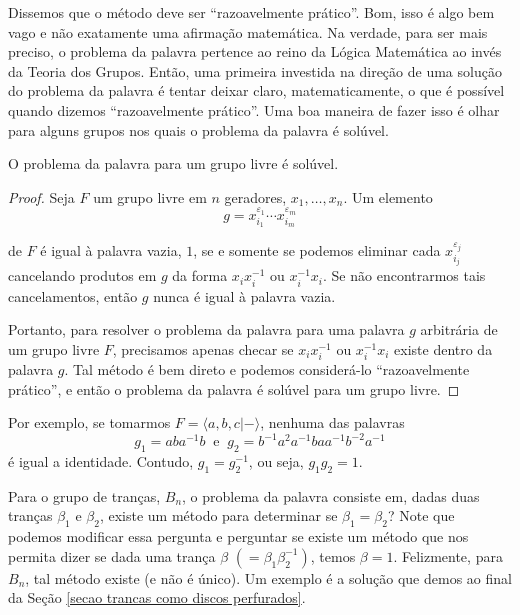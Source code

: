 	\par\vspace{0.3cm} Dissemos que o método deve ser ``razoavelmente prático''. Bom, isso é algo bem vago 
	e não exatamente uma afirmação matemática. Na verdade, para ser mais preciso, o problema da palavra 
	pertence ao reino da Lógica Matemática ao invés da Teoria dos Grupos. Então, uma primeira investida 
	na direção de uma solução do problema da palavra é tentar deixar claro, matematicamente, o que é possível
	quando dizemos ``razoavelmente prático''. Uma boa maneira de fazer isso é olhar para alguns grupos nos 
	quais o problema da palavra é solúvel.
	\begin{theorem}
	\label{problema da palavra soluvel para grupos livres}
		O problema da palavra para um grupo livre é solúvel.
	\end{theorem}
	\begin{proof}
		Seja $F$ um grupo livre em $n$ geradores, $x_1, \dots, x_n$. Um elemento
		\begin{equation*}
		    g = x_{i_1}^{\varepsilon_1}\cdots x_{i_m}^{\varepsilon_m}
		\end{equation*}
		\par\vspace{0.3cm} de $F$ é igual à palavra vazia, $1$, se e somente se podemos eliminar cada
		$x_{i_j}^{\varepsilon_j}$ cancelando produtos em $g$ da forma $x_ix_i^{-1}$ ou $x_i^{-1}x_i$. 
		Se não encontrarmos tais cancelamentos, então $g$ nunca é igual à palavra vazia.
		
		\par\vspace{0.3cm} Portanto, para resolver o problema da palavra para uma palavra $g$ arbitrária de 
		um grupo livre $F$, precisamos apenas checar se $x_ix_i^{-1}$ ou $x_i^{-1}x_i$ existe dentro da 
		palavra $g$. Tal método é bem direto e podemos considerá-lo ``razoavelmente prático'', e então o 
		problema da palavra é solúvel para um grupo livre. 
	\end{proof}
	\par\vspace{0.3cm} Por exemplo, se tomarmos $F = \langle a,b,c|- \rangle$, nenhuma das palavras 
	\begin{equation*}
	    g_1 = aba^{-1}b \ \text{ e } \ g_2 = b^{-1}a^2a^{-1}baa^{-1}b^{-2}a^{-1}
	\end{equation*}
	é igual a identidade. Contudo, $g_1 = g_2^{-1}$, ou seja, $g_1g_2 = 1$.
	
	\par\vspace{0.3cm} Para o grupo de tranças, $B_n$, o problema da palavra consiste em, dadas duas 
	tranças $\beta_1$ e $\beta_2$, existe um método para determinar se $\beta_1 = \beta_2$? Note que 
	podemos modificar essa pergunta e perguntar se existe um método que nos permita dizer se dada uma trança
	$\beta$ $(=\beta_1\beta_2^{-1})$, temos $\beta = 1$. Felizmente, para $B_n$, tal método existe 
	(e não é único). Um exemplo é a solução que demos ao final da 
	Seção \eqref{secao trancas como discos perfurados}.
	
